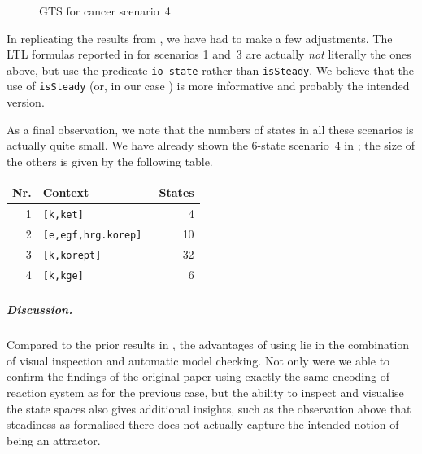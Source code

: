 %
\begin{figure}\centering
\scalebox{.9}{}
\caption{GTS for cancer scenario~4}
\label{fig:maude-gts}
\end{figure}
%
In replicating the results from \cite{DBLP:conf/cmsb/BallisBFO24}, we have had to make a few adjustments. The LTL formulas reported in \cite[Page~14]{DBLP:conf/cmsb/BallisBFO24} for scenarios 1 and~3 are actually \emph{not} literally the ones above, but use the predicate \verb=io-state= rather than \verb=isSteady=. We believe that the use of \verb=isSteady= (or, in our case \steadyR) is more informative and probably the intended version.

As a final observation, we note that the numbers of states in all these scenarios is actually quite small. We have already shown the 6-state scenario~4 in ; the size of the others is given by the following table.
%
\begin{center}
\begin{tabular}{rlr}
\bf Nr. & \bf Context & \bf States \\
\hline\hline
1 & \tt [k,ket] & 4 \\
2 & \tt [{e,egf,hrg}.korep] & 10 \\
3 & \tt [k,korept] & 32 \\
4 & \tt [k,kge] & 6
\end{tabular}
\end{center}

\subparagraph*{Discussion.}

Compared to the prior results in \cite{DBLP:conf/cmsb/BallisBFO24}, the advantages of using \GROOVE lie in the combination of visual inspection and automatic model checking. Not only were we able to confirm the findings of the original paper using exactly the same encoding of reaction system as for the previous case, but the ability to inspect and visualise the state spaces also gives additional insights, such as the observation above that steadiness as formalised there does not actually capture the intended notion of being an attractor.
